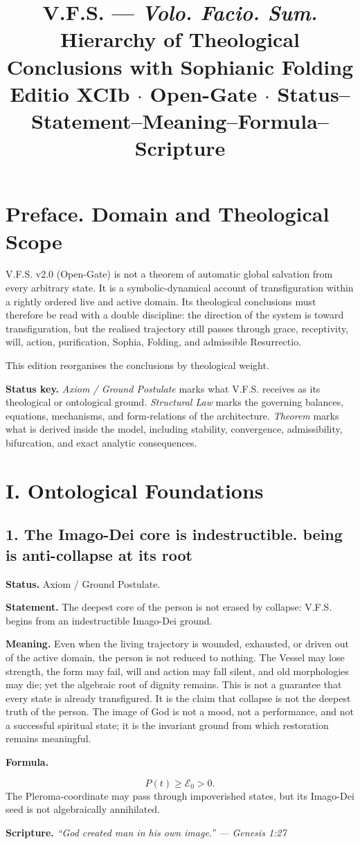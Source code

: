 \documentclass[11pt]{article}
\title{\textbf{V.F.S.} --- \emph{Volo. Facio. Sum.}\\[2pt]
\large Hierarchy of Theological Conclusions with Sophianic Folding\\[2pt]
\normalsize Editio XCIb $\cdot$ Open-Gate $\cdot$ Status--Statement--Meaning--Formula--Scripture}
\author{}
\date{}
\newcommand{\E}{\mathcal{E}_0}
\newcommand{\thesis}[2]{%
  \subsection*{#1. #2}%
}
\newcommand{\status}[1]{\textbf{Status.} #1\par}
\newcommand{\statement}[1]{\textbf{Statement.} #1\par}
\newcommand{\explain}[1]{\textbf{Meaning.} #1\par}
\newcommand{\formula}[1]{\textbf{Formula.}\par #1\par}
\newcommand{\scripture}[2]{\textbf{Scripture.} {\small\itshape ``#1'' --- #2}\par}
\begin{document}
\maketitle
\vspace{-1.8em}

\section*{Preface. Domain and Theological Scope}
V.F.S. v2.0 (Open-Gate) is not a theorem of automatic global salvation from every arbitrary state. It is a symbolic-dynamical account of transfiguration within a rightly ordered live and active domain. Its theological conclusions must therefore be read with a double discipline: the direction of the system is toward transfiguration, but the realised trajectory still passes through grace, receptivity, will, action, purification, Sophia, Folding, and admissible Resurrectio.

This edition reorganises the conclusions by theological weight.

\textbf{Status key.} \emph{Axiom / Ground Postulate} marks what V.F.S. receives as its theological or ontological ground. \emph{Structural Law} marks the governing balances, equations, mechanisms, and form-relations of the architecture. \emph{Theorem} marks what is derived inside the model, including stability, convergence, admissibility, bifurcation, and exact analytic consequences.

\section{I. Ontological Foundations}

\thesis{1}{The Imago-Dei core is indestructible. being is anti-collapse at its root}
\status{Axiom / Ground Postulate.}
\statement{The deepest core of the person is not erased by collapse: V.F.S. begins from an indestructible Imago-Dei ground.}
\explain{Even when the living trajectory is wounded, exhausted, or driven out of the active domain, the person is not reduced to nothing. The Vessel may lose strength, the form may fail, will and action may fall silent, and old morphologies may die; yet the algebraic root of dignity remains. This is not a guarantee that every state is already transfigured. It is the claim that collapse is not the deepest truth of the person. The image of God is not a mood, not a performance, and not a successful spiritual state; it is the invariant ground from which restoration remains meaningful.}
\formula{\[
  P(t)\ge \E>0.
\]
The Pleroma-coordinate may pass through impoverished states, but its Imago-Dei seed is not algebraically annihilated.}
\scripture{God created man in his own image.}{Genesis 1:27}
\end{document}
